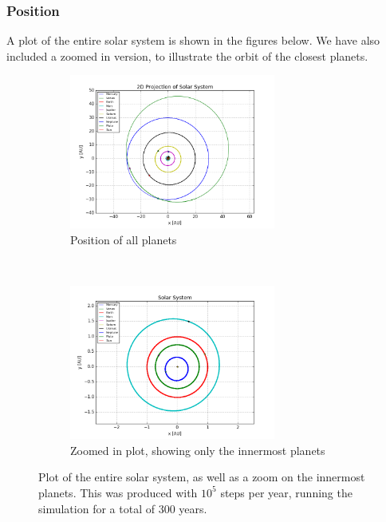 \documentclass[a4paper, 10pt]{article}
\begin{document}
\subsubsection{Position}
A plot of the entire solar system is shown in the figures below. We have also included a zoomed in version, to illustrate the orbit of the closest planets.
\begin{figure}[!ht]
    \centering
    \begin{subfigure}[H!]{0.5\textwidth}
        \centering
        \includegraphics[height=2.0in]{orbitfull.png}
        \caption{Position of all planets}
    \end{subfigure}%
    ~ 
    \begin{subfigure}[H!]{0.5\textwidth}
        \centering
        \includegraphics[height=2.0in]{orbitFull.png}
        \caption{Zoomed in plot, showing only the innermost planets}
    \end{subfigure}
    \caption{Plot of the entire solar system, as well as a zoom on the innermost planets. This was produced with $10^5$ steps per year, running the simulation for a total of 300 years.} \label{fig:solar_system}
\end{figure}
\end{document}
